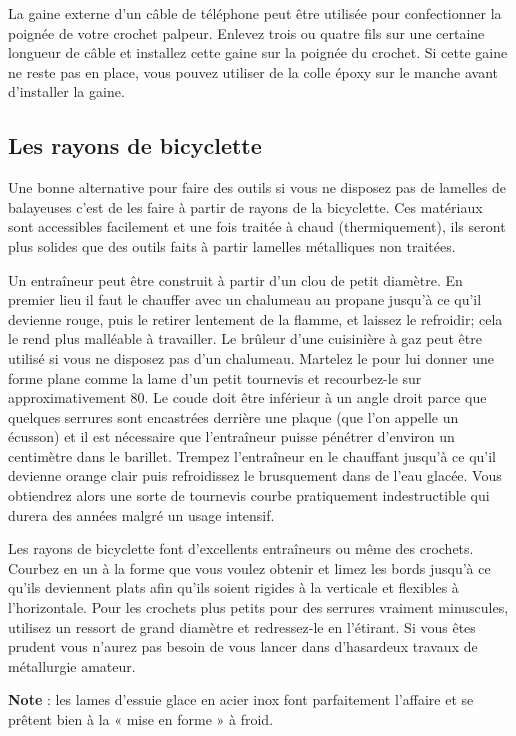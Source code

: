 \documentclass[a4paper,french,11pt,twoside]{report}
\begin{document}
La gaine externe d'un câble de téléphone peut être utilisée pour confectionner la poignée de votre crochet palpeur. Enlevez trois ou quatre fils sur une certaine longueur de câble et installez cette gaine sur la poignée du crochet. Si cette gaine ne reste pas en place, vous pouvez utiliser de la colle époxy sur le manche avant d'installer la gaine.

\subsection{Les rayons de bicyclette}

Une bonne alternative pour faire des outils si vous ne disposez pas de lamelles de balayeuses c'est de les faire à partir de rayons de la bicyclette. Ces matériaux sont accessibles facilement et une fois traitée à chaud (thermiquement), ils seront plus solides que des outils faits à partir lamelles métalliques non traitées.

Un entraîneur peut être construit à partir d'un clou de petit diamètre. En premier lieu il faut le chauffer avec un chalumeau au propane jusqu'à ce qu'il devienne rouge, puis le retirer lentement de la flamme, et laissez le refroidir; cela le rend plus malléable à travailler. Le brûleur d'une cuisinière à gaz peut être utilisé si vous ne disposez pas d'un chalumeau. Martelez le pour lui donner une forme plane comme la lame d'un petit tournevis et recourbez-le sur approximativement 80\textdegree{}. Le coude doit être inférieur à un angle droit parce que quelques serrures sont encastrées derrière une plaque (que l'on appelle un écusson) et il est nécessaire que l'entraîneur puisse pénétrer d'environ un centimètre dans le barillet. Trempez l'entraîneur en le chauffant jusqu'à ce qu'il devienne orange clair puis refroidissez le brusquement dans de l'eau glacée. Vous obtiendrez alors une sorte de tournevis courbe pratiquement indestructible qui durera des années malgré un usage intensif.

Les rayons de bicyclette font d'excellents entraîneurs ou même des crochets. Courbez en un à la forme que vous voulez obtenir et limez les bords jusqu'à ce qu'ils deviennent plats afin qu'ils soient rigides à la verticale et flexibles à l'horizontale. Pour les crochets plus petits pour des serrures vraiment minuscules, utilisez un ressort de grand diamètre et redressez-le en l'étirant. Si vous êtes prudent vous n'aurez pas besoin de vous lancer dans d'hasardeux travaux de métallurgie amateur.

\medskip
\noindent \textbf{Note} : les lames d'essuie glace en acier inox font parfaitement l'affaire et se prêtent bien à la « mise en forme » à froid.
\end{document}
